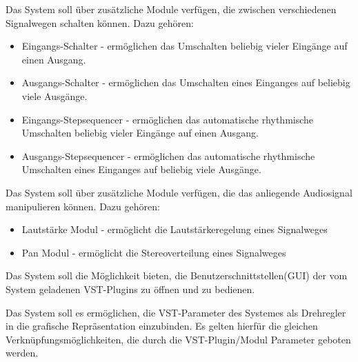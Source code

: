  Das System soll über zusätzliche Module verfügen, die zwischen verschiedenen Signalwegen schalten können. Dazu gehören:
\begin{itemize}
	\item Eingangs-Schalter - ermöglichen das Umschalten beliebig vieler Eingänge auf einen Ausgang.
	\item Ausgangs-Schalter - ermöglichen das Umschalten eines Einganges auf beliebig viele Ausgänge.
	\item Eingangs-Stepsequencer - ermöglichen das automatische rhythmische Umschalten beliebig vieler Eingänge auf einen Ausgang.
	\item Ausgangs-Stepsequencer - ermöglichen das automatische rhythmische Umschalten eines Einganges auf beliebig viele Ausgänge.
\end{itemize}

 Das System soll über zusätzliche Module verfügen, die das anliegende Audiosignal manipulieren können. Dazu gehören:
\begin{itemize}
 	\item Lautstärke Modul - ermöglicht die Lautstärkeregelung eines Signalweges
	\item Pan Modul - ermöglicht die Stereoverteilung eines Signalweges
\end{itemize}

 Das System soll die Möglichkeit bieten, die Benutzerschnittstellen(GUI) der vom System geladenen VST-Plugins zu öffnen und zu bedienen.

 Das System soll es ermöglichen, die VST-Parameter des Systemes als Drehregler in die grafische Repräsentation einzubinden. Es gelten hierfür die gleichen Verknüpfungsmöglichkeiten, die durch die VST-Plugin/Modul Parameter geboten werden.













